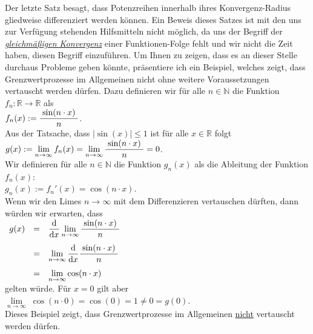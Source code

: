 \remark
Der letzte Satz besagt, dass Potenzreihen innerhalb ihres Konvergenz-Radius gliedweise
differenziert werden k\"onnen.   Ein Beweis dieses Satzes ist mit den uns zur Verf\"ugung
stehenden Hilfsmitteln nicht m\"oglich, da uns der Begriff der
\href{https://en.wikipedia.org/wiki/Uniform_convergence}{\emph{gleichm\"a{\ss}igen Konvergenz}}
einer Funktionen-Folge fehlt und wir nicht die Zeit haben, diesen Begriff einzuf\"uhren.  Um  Ihnen
zu zeigen, dass es an dieser Stelle durchaus Probleme geben k\"onnte, pr\"asentiere ich ein
Beispiel, welches zeigt, dass  
Grenzwertprozesse im Allgemeinen nicht ohne weitere Voraussetzungen vertauscht werden d\"urfen.
Dazu definieren wir f\"ur alle $n \in \mathbb{N}$ die Funktion $f_n:\mathbb{R} \rightarrow \mathbb{R}$ als
\\[0.2cm]
\hspace*{1.3cm}
$\displaystyle f_n(x) := \frac{\;\sin(n \cdot x)\;}{n}$.
\\[0.2cm]
Aus der Tatsache, dass $|\sin(x)| \leq 1$ ist f\"ur alle $x\in \mathbb{R}$ folgt
\\[0.2cm]
\hspace*{1.3cm}
$g(x) := \displaystyle\lim\limits_{n\rightarrow\infty} f_n(x) = \lim\limits_{n\rightarrow\infty} \frac{\;\sin(n \cdot x)\;}{n} = 0$. 
\\[0.2cm]
Wir definieren f\"ur alle $n\in\mathbb{N}$ die Funktion $g_n(x)$ als die Ableitung der Funktion $f_n(x)$:
\\[0.2cm]
\hspace*{1.3cm}
$g_n(x) := f_n'(x) = \cos(n \cdot x)$.
\\[0.2cm]
Wenn wir den Limes $n \rightarrow \infty$ mit dem Differenzieren vertauschen d\"urften, dann
w\"urden wir erwarten, dass 
\\[0.2cm]
\hspace*{1.3cm}
$
\begin{array}[t]{lcl}
g(x) & = & \displaystyle \displaystyle\frac{\textrm{d}}{\textrm{d}x} \lim\limits_{n\rightarrow\infty} \frac{\;\sin(n \cdot x)\;}{n} \\[0.4cm]
     & = & \lim\limits_{n\rightarrow\infty} \displaystyle\frac{\textrm{d}}{\textrm{d}x} \frac{\;\sin(n \cdot x)\;}{n} \\[0.4cm]
     & = & \displaystyle \lim\limits_{n\rightarrow\infty} \cos(n \cdot x) 
\end{array}
$
\\[0.2cm]
gelten w\"urde.  
F\"ur $x = 0$ gilt aber
\\[0.2cm]
\hspace*{1.3cm}
$\lim\limits_{n\rightarrow\infty} \;\cos(n \cdot 0) = \cos(0) = 1 \not= 0 = g(0)$.
\\[0.2cm]
Dieses Beispiel zeigt, dass Grenzwertprozesse im Allgemeinen \underline{nicht} vertauscht werden
d\"urfen. 
\eox

